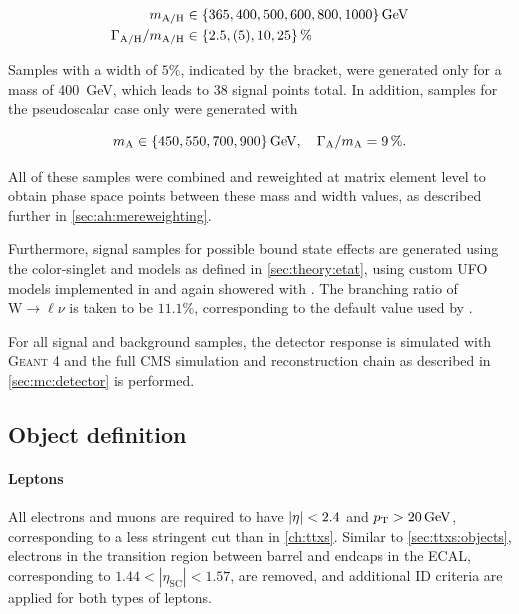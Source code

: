 \begin{equation}
\begin{split}
    m_{\AH} &\in \{ 365, 400, 500, 600, 800, 1000 \} \, \si{\GeV} \\
    \Gamma_{\AH} / m_{\AH} &\in \{ 2.5, (5), 10, 25 \} \, \%
\end{split}
\end{equation}

Samples with a width of $5\%$, indicated by the bracket, were generated only for a mass of \SI{400}{\GeV}, which leads to 38 signal points total. In addition, samples for the pseudoscalar case only were generated with

\begin{equation}
    \mA \in \{ 450, 550, 700, 900 \} \, \si{GeV}, \quad \wA / \mA = 9 \, \%.
\end{equation}

All of these samples were combined and reweighted at matrix element level to obtain phase space points between these mass and width values, as described further in \cref{sec:ah:mereweighting}.

Furthermore, signal samples for possible \ttbar bound state effects are generated using the color-singlet \etat and \chit models as defined in \cref{sec:theory:etat}, using custom UFO models implemented in \amcatnlo and again showered with \pythia.
The branching ratio of $\mathrm{W} \rightarrow \ell \nu$ is taken to be $11.1\%$, corresponding to the default value used by \amcatnlo.

For all signal and background samples, the detector response is simulated with \textsc{Geant 4} and the full CMS simulation and reconstruction chain as described in \cref{sec:mc:detector} is performed.

\subsection{Object definition}
\label{sec:ah:objects}

\paragraph{Leptons} 

All electrons and muons are required to have $\abseta < 2.4$ and $\pt > \SI{20}{\GeV}$, corresponding to a less stringent cut than in \cref{ch:ttxs}. Similar to \cref{sec:ttxs:objects}, electrons in the transition region between barrel and endcaps in the ECAL, corresponding to $1.44 < |\eta_{\mathrm{SC}}| < 1.57$, are removed, and additional ID criteria are applied for both types of leptons.

